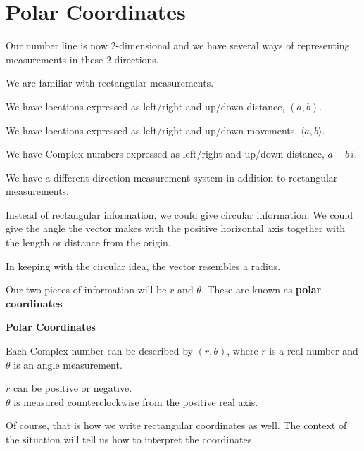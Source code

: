 \documentclass{ximera}
\begin{document}
\section*{Polar Coordinates}


Our number line is now 2-dimensional and we have several ways of representing measurements in these 2 directions.

We are familiar with rectangular measurements. 

We have locations expressed as left/right and up/down distance, $(a,b)$.

We have locations expressed as left/right and up/down movements, $\langle a,b \rangle$.

We have Complex numbers expressed as left/right and up/down distance, $a + b \, i$.

We have a different direction measurement system in addition to rectangular measurements.

Instead of rectangular information, we could give circular information.  We could give the angle the vector makes with the positive horizontal axis together with the length or distance from the origin. 

In keeping with the circular idea, the vector resembles a radius.  

Our two pieces of information will be $r$ and $\theta$. These are known as \textbf{polar coordinates}




\begin{definition}   \textbf{\textcolor{green!50!black}{Polar Coordinates}} 

Each Complex number can be described by $(r, \theta)$, where $r$ is a real number and $\theta$ is an angle measurement.  


$r$ can be positive or negative. \\
$\theta$ is measured counterclockwise from the positive real axis. 

\end{definition}


Of course, that is how we write rectangular coordinates as well.  The context of the situation will tell us how to interpret the coordinates.
\end{document}

